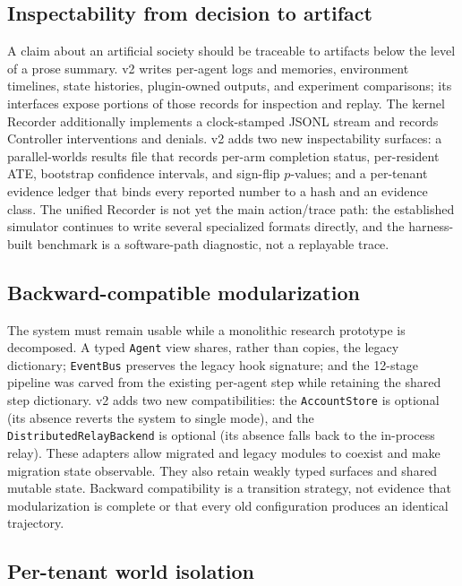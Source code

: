 \subsection{Inspectability from decision to artifact}
\label{sec:dgo:inspectability}

A claim about an artificial society should be traceable to artifacts below
the level of a prose summary.  v2 writes per-agent logs and memories,
environment timelines, state histories, plugin-owned outputs, and
experiment comparisons; its interfaces expose portions of those records for
inspection and replay.  The kernel Recorder additionally implements a
clock-stamped JSONL stream and records Controller interventions and denials.
v2 adds two new inspectability surfaces: a parallel-worlds results file that
records per-arm completion status, per-resident ATE, bootstrap confidence
intervals, and sign-flip $p$-values; and a per-tenant evidence ledger that
binds every reported number to a hash and an evidence class.  The unified
Recorder is not yet the main action/trace path: the established simulator
continues to write several specialized formats directly, and the
harness-built benchmark is a software-path diagnostic, not a replayable
trace.

\subsection{Backward-compatible modularization}
\label{sec:dgo:backcompat}

The system must remain usable while a monolithic research prototype is
decomposed.  A typed \texttt{Agent} view shares, rather than copies, the
legacy dictionary; \texttt{EventBus} preserves the legacy hook signature; and
the 12-stage pipeline was carved from the existing per-agent step while
retaining the shared step dictionary.  v2 adds two new compatibilities: the
\texttt{AccountStore} is optional (its absence reverts the system to single
mode), and the \texttt{DistributedRelayBackend} is optional (its absence
falls back to the in-process relay).  These adapters allow migrated and
legacy modules to coexist and make migration state observable.  They also
retain weakly typed surfaces and shared mutable state.  Backward
compatibility is a transition strategy, not evidence that modularization is
complete or that every old configuration produces an identical trajectory.

\subsection{Per-tenant world isolation}
\label{sec:dgo:multitenant}

